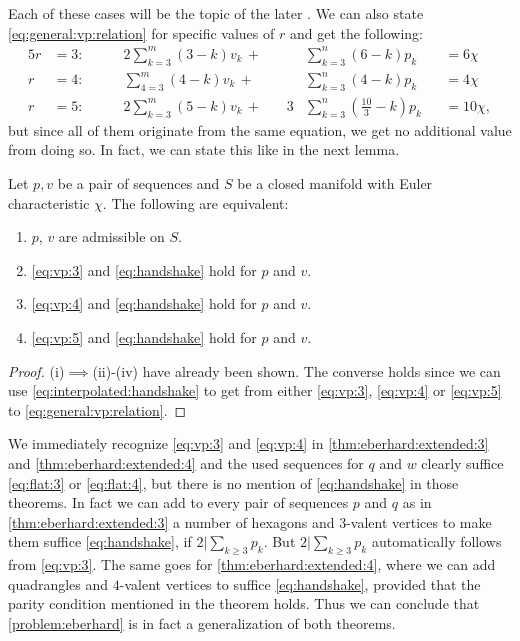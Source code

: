 Each of these cases will be the topic of the later . We can also state \eqref{eq:general:vp:relation} for specific values of $r$ and get the following:
\begin{alignat}{5}
  r &= 3: \qquad &2 \sum_{k=3}^m \left(3 - k \right) v_k\,+\, &&  & \sum_{k=3}^n \left(6 - k \right) p_k &&= 6 \chi \label{eq:vp:3}\\
  r &= 4: \qquad &  \sum_{4=3}^m \left(4 - k \right) v_k\,+\, &&  & \sum_{k=3}^n \left(4 - k \right) p_k &&= 4 \chi  \label{eq:vp:4}\\
  r &= 5: \qquad &2 \sum_{k=3}^m \left(5 - k \right) v_k\,+\, &&3 & \sum_{k=3}^n \left( \tfrac{10}{3} - k \right) p_k &&= 10 \chi, \label{eq:vp:5}
\end{alignat}
but since all of them originate from the same equation, we get no additional value from doing so. In fact, we can state this like in the next lemma.
\begin{lemma}
  Let $p, v$ be a pair of sequences and $S$ be a closed manifold with {\sc Euler} characteristic $\chi$. The following are equivalent:
  \begin{enumerate}[label=(\roman*)]
    \item $p$, $v$ are admissible on $S$.
    \item \eqref{eq:vp:3} and \eqref{eq:handshake} hold for $p$ and $v$.
    \item \eqref{eq:vp:4} and \eqref{eq:handshake} hold for $p$ and $v$.
    \item \eqref{eq:vp:5} and \eqref{eq:handshake} hold for $p$ and $v$.
  \end{enumerate}
  \begin{proof} (i)$\implies$(ii)-(iv) have already been shown. The converse holds since we can use \eqref{eq:interpolated:handshake} to get from either \eqref{eq:vp:3}, \eqref{eq:vp:4} or \eqref{eq:vp:5} to \eqref{eq:general:vp:relation}.
  \end{proof}
\end{lemma}

\begin{remark}
  We immediately recognize \eqref{eq:vp:3} and \eqref{eq:vp:4} in \autoref{thm:eberhard:extended:3} and \autoref{thm:eberhard:extended:4} and the used sequences for $q$ and $w$ clearly suffice \eqref{eq:flat:3} or \eqref{eq:flat:4}, but there is no mention of \eqref{eq:handshake} in those theorems. In fact we can add to every pair of sequences $p$ and $q$ as in \autoref{thm:eberhard:extended:3} a number of hexagons and $3$-valent vertices to make them suffice \eqref{eq:handshake}, if $2 | \sum_{k \geq 3} p_k$. But $2 | \sum_{k \geq 3} p_k$ automatically follows from \eqref{eq:vp:3}. The same goes for \autoref{thm:eberhard:extended:4}, where we can add quadrangles and $4$-valent vertices to suffice \eqref{eq:handshake}, provided that the parity condition mentioned in the theorem holds. Thus we can conclude that \autoref{problem:eberhard} is in fact a generalization of both theorems. 
\end{remark}


